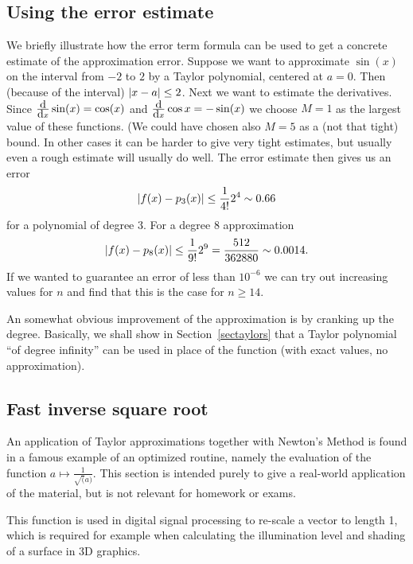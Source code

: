\subsection{Using the error estimate}

We briefly illustrate how the error term formula can be used to get a
concrete estimate of the approximation error. Suppose we
want to approximate $\sin(x)$ on the interval from $-2$ to $2$ by a Taylor
polynomial, centered at $a=0$. Then (because of the interval) $\left|x-a\right|\le
2$. Next we want to estimate the derivatives. Since $\frac{\mbox{d}}{\mbox{d}x}\sin(x)=\cos(x)$
and $\frac{\mbox{d}}{\mbox{d}x}\cos{x}=-\sin(x)$ we choose $M=1$ as the largest value of these
functions. (We could have chosen also $M=5$ as a (not that tight) bound. In
other cases it can be harder to give very tight estimates, but usually even
a rough estimate will usually do well. The error estimate then gives us an
error
\[
\left|f(x)-p_3(x)\right|\le \frac{1}{4!}2^4\sim 0.66
\]
for a polynomial of degree $3$.
For a degree 8 approximation 
\[
\left|f(x)-p_8(x)\right|\le \frac{1}{9!}2^9=\frac{512}{362880}\sim 0.0014.
\]
If we wanted to guarantee an error of less than $10^{-6}$ we can try out
increasing values for $n$  and find that this is the case for $n\ge 14$.
\smallskip

An somewhat obvious improvement of the approximation is by cranking up the
degree. Basically, we shall show in Section~\ref{sectaylors}
that a Taylor polynomial ``of degree
infinity'' can be used in place of the function (with exact values, no
approximation).

\subsection{Fast inverse square root}

An application of Taylor approximations together with Newton's Method
is found in a famous example of an
optimized routine, namely the evaluation of the function $a\mapsto
\frac{1}{\sqrt(a)}$. This section is intended purely to give a real-world
application of the material, but is not relevant for homework or exams.

This function is used in digital signal processing to re-scale a vector to
length 1, which is required for example when calculating the illumination
level and shading of a surface in 3D graphics.


